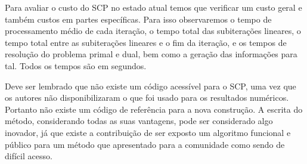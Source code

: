 \noindent
Para avaliar o custo do SCP no estado atual temos que verificar um custo geral
e também custos em partes específicas. Para isso observaremos o tempo
de processamento médio de cada iteração, o tempo total das subiterações lineares,
o tempo total entre as subiterações lineares e o fim da iteração, e os tempos
de resolução do problema primal e dual, bem como a geração das informações para tal.
Todos os tempos são em segundos. %

Deve ser lembrado que não existe um código acessível para o SCP, uma vez que os
autores não disponibilizaram o que foi usado para os resultados numéricos. Portanto
não existe um código de referência para a nova construção. A escrita do método,
considerando todas as suas vantagens, pode ser considerado algo inovador, já que
existe a contribuição de ser exposto um algoritmo funcional e público para um
método que apresentado para a comunidade como sendo de difícil acesso.





